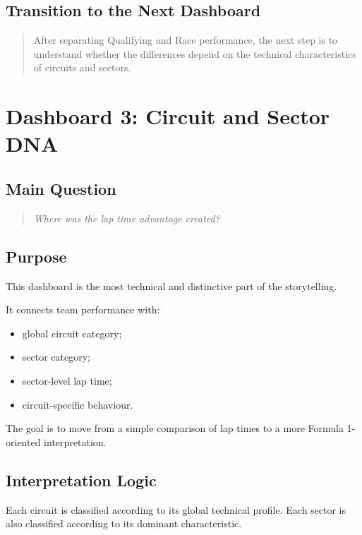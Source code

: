 \documentclass[12pt,a4paper]{article}
\begin{document}
	\subsection{Transition to the Next Dashboard}
	
	\begin{quote}
		After separating Qualifying and Race performance, the next step is to understand whether the differences depend on the technical characteristics of circuits and sectors.
	\end{quote}
	
	\section{Dashboard 3: Circuit and Sector DNA}
	
	\subsection{Main Question}
	
	\begin{quote}
		\textit{Where was the lap time advantage created?}
	\end{quote}
	
	\subsection{Purpose}
	
	This dashboard is the most technical and distinctive part of the storytelling.
	
	It connects team performance with:
	
	\begin{itemize}[leftmargin=1.2cm]
		\item global circuit category;
		\item sector category;
		\item sector-level lap time;
		\item circuit-specific behaviour.
	\end{itemize}
	
	The goal is to move from a simple comparison of lap times to a more Formula 1-oriented interpretation.
	
	\subsection{Interpretation Logic}
	
	Each circuit is classified according to its global technical profile.
	Each sector is also classified according to its dominant characteristic.
	
\end{document}
